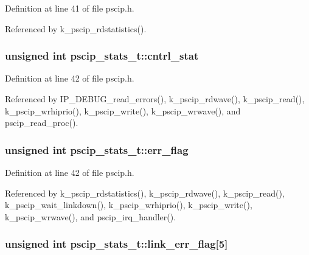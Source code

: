 Definition at line 41 of file pscip.h.

Referenced by k\_\-pscip\_\-rdstatistics().\hypertarget{structpscip__stats__t_4b258b817442484add900e9c0277bf35}{
\subsubsection[{cntrl\_\-stat}]{\setlength{\rightskip}{0pt plus 5cm}unsigned int {\bf pscip\_\-stats\_\-t::cntrl\_\-stat}}}
\label{structpscip__stats__t_4b258b817442484add900e9c0277bf35}




Definition at line 42 of file pscip.h.

Referenced by IP\_\-DEBUG\_\-read\_\-errors(), k\_\-pscip\_\-rdwave(), k\_\-pscip\_\-read(), k\_\-pscip\_\-wrhiprio(), k\_\-pscip\_\-write(), k\_\-pscip\_\-wrwave(), and pscip\_\-read\_\-proc().\hypertarget{structpscip__stats__t_df6485c52099018d382850dc396c0d48}{
\subsubsection[{err\_\-flag}]{\setlength{\rightskip}{0pt plus 5cm}unsigned int {\bf pscip\_\-stats\_\-t::err\_\-flag}}}
\label{structpscip__stats__t_df6485c52099018d382850dc396c0d48}




Definition at line 42 of file pscip.h.

Referenced by k\_\-pscip\_\-rdstatistics(), k\_\-pscip\_\-rdwave(), k\_\-pscip\_\-read(), k\_\-pscip\_\-wait\_\-linkdown(), k\_\-pscip\_\-wrhiprio(), k\_\-pscip\_\-write(), k\_\-pscip\_\-wrwave(), and pscip\_\-irq\_\-handler().\hypertarget{structpscip__stats__t_507d5bcb9f66993e4a643fa99e6670ca}{
\subsubsection[{link\_\-err\_\-flag}]{\setlength{\rightskip}{0pt plus 5cm}unsigned int {\bf pscip\_\-stats\_\-t::link\_\-err\_\-flag}\mbox{[}5\mbox{]}}}
\label{structpscip__stats__t_507d5bcb9f66993e4a643fa99e6670ca}




